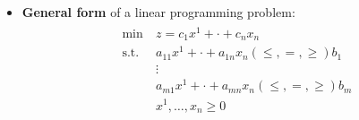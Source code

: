 \documentclass[english]{article}
\begin{document}
\begin{itemize}
  \item \textbf{General form} of a linear programming problem:
        \begin{gather}
          \begin{aligned}
            \min \         & z = c_1 x^1 + \cdot + c_n x_n                                    \\
            \text{s.t.} \  & a_{11} x^1 + \cdot + a_{1n} x_n \left( \leq, =, \geq \right) b_1 \\
                           & \vdots                                                           \\
                           & a_{m1} x^1 + \cdot + a_{mn} x_n \left( \leq, =, \geq \right) b_m \\
                           & x^1, \ldots, x_n \geq 0
          \end{aligned}
        \end{gather}


\end{itemize}
\end{document}
